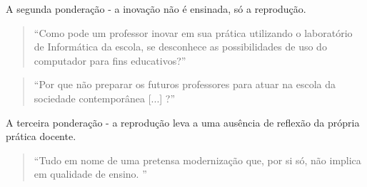 \documentclass[12pt]{article}
\begin{document}
A segunda ponderação - a inovação não é ensinada, só a reprodução.
\begin{quote}
	\sc
``Como pode um professor inovar em sua prática utilizando o laboratório de Informática da escola, se desconhece as possibilidades de uso do computador para fins educativos?''
\end{quote}

\begin{quote}
	\sc
``Por que não preparar os futuros professores para atuar na escola da sociedade contemporânea [...] ?''
\end{quote}

A terceira ponderação - a reprodução leva a uma ausência de reflexão da própria prática docente.
\begin{quote}
	\sc
``Tudo em nome de uma pretensa modernização que, por si só, não implica em qualidade de ensino. ''
\end{quote}



%
\end{document}
